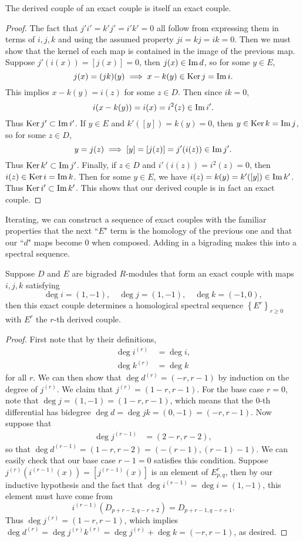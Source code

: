 \documentclass[twoside,10pt]{article}
\begin{document}
\begin{prop}
	The derived couple of an exact couple is itself an exact couple.
\end{prop}
\begin{proof}
	The fact that $j'i'=k'j'=i'k'=0$ all follow from expressing them in terms of $i,j,k$ and using the assumed property $ji=kj=ik=0$. Then we must show that the kernel of each map is contained in the image of the previous map. Suppose $j'(i(x))=[j(x)]=0$, then $j(x) \in \operatorname{Im} d$, so for some $y \in E$,
	\[
		j(x)=(jk)(y) \implies x-k(y) \in \operatorname{Ker} j = \operatorname{Im} i.
	\] This implies $x-k(y) = i(z)$ for some $z\in D$. Then since $ik=0$,
	\[
		i(x-k(y))=i(x)=i^2(z) \in \operatorname{Im} i'.
	\] Thus $\operatorname{Ker} j' \subset \operatorname{Im} i'$. If $y \in E$ and $k'([y])=k(y)=0$, then $y\in \operatorname{Ker} k=\operatorname{Im} j$, so for some $z \in D$,
	\[
		y=j(z) \implies [y]=[j(z)]=j'(i(z)) \in \operatorname{Im} j'.
	\] Thus $\operatorname{Ker} k'\subset \operatorname{Im} j'$. Finally, if $z \in D$ and $i'(i(z))=i^2(z)=0$, then $i(z) \in \operatorname{Ker} i=\operatorname{Im} k$. Then for some $y \in E$, we have $i(z)=k(y)=k'([y]) \in \operatorname{Im} k'$. Thus $\operatorname{Ker} i' \subset \operatorname{Im} k'$. This shows that our derived couple is in fact an exact couple.
\end{proof}

Iterating, we can construct a sequence of exact couples with the familiar properties that the next ``$E$" term is the homology of the previous one and that our ``$d$" maps become 0 when composed. Adding in a bigrading makes this into a spectral sequence.

\begin{thrm}[]
	\label{thrm:ec2ss}
	Suppose $D$ and $E$ are bigraded $R$-modules that form an exact couple with maps $i,j,k$ satisfying
	\[
	\deg i=(1,-1), \quad \deg j=(1,-1), \quad \deg k=(-1,0),
\] then this exact couple determines a homological spectral sequence $\left\{ E^{r} \right\}_{r \geq 0}$ with $E^{r}$ the $r$-th derived couple.
\end{thrm}
\begin{proof}
	First note that by their definitions,
	\begin{align*}
		\deg i^{(r)}&=\deg i,\\
		\deg k^{(r)}&=\deg k
	\end{align*}
	for all $r$. We can then show that $\deg d^{(r)}=(-r,r-1)$ by induction on the degree of $j^{(r)}$. We claim that $j^{(r)}= (1-r,r-1)$. For the base case $r=0$, note that $\deg j = (1,-1) = (1-r,r-1)$, which means that the 0-th differential has bidegree $\deg d = \deg jk = (0,-1)=(-r,r-1)$. Now suppose that
	\begin{align*}
		\deg j^{(r-1)} &= (2-r,r-2),
	\end{align*}
	so that $\deg d^{(r-1)} = (1-r,r-2) = (-(r-1),(r-1)-1)$. We can easily check that our base case $r-1=0$ satisfies this condition. Suppose $j^{(r)}(i^{(r-1)}(x)) = [j^{(r-1)}(x)]$ is an element of $E_{p,q}^{r}$, then by our inductive hypothesis and the fact that $\deg i^{(r-1)}=\deg i = (1,-1)$, this element must have come from
	\[
		i^{(r-1)}(D_{p+r-2,q-r+2}) = D_{p+r-1,q-r+1}.
	\] Thus $\deg j^{(r)} = (1-r,r-1)$, which implies $\deg d^{(r)} = \deg j^{(r)}k^{(r)} = \deg j^{(r)}+\deg k = (-r,r-1)$, as desired.
\end{proof}
\end{document}
